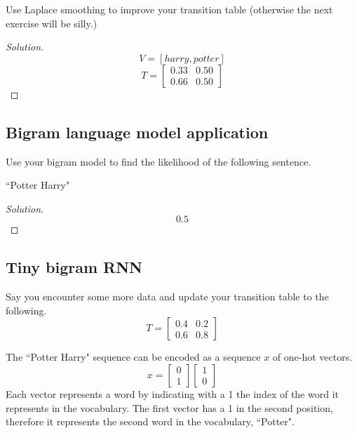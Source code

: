 \documentclass{article}
\begin{document}
Use Laplace smoothing to improve your transition table (otherwise the next exercise will be silly.)

\begin{proof}[Solution]
    $$V = [harry, potter]$$
    $$T = \begin{bmatrix}
        0.33 & 0.50 \\
        0.66 & 0.50
    \end{bmatrix}$$
\end{proof}

\subsection{Bigram language model application}
Use your bigram model to find the likelihood of the following sentence.
\begin{center}
    ``Potter Harry"
\end{center}

\begin{proof}[Solution]
    $$ 0.5 $$
\end{proof}

\subsection{Tiny bigram RNN}
Say you encounter some more data and update your transition table to the following.
$$ T = \begin{bmatrix} 0.4 & 0.2 \\ 0.6 & 0.8 \end{bmatrix} $$

The ``Potter Harry" sequence can be encoded as a sequence $x$ of one-hot vectors.
$$ x = \begin{bmatrix} 0 \\ 1 \end{bmatrix} \begin{bmatrix} 1 \\ 0 \end{bmatrix} $$
Each vector represents a word by indicating with a 1 the index of the word it represents in the vocabulary. The first vector has a 1 in the second position, therefore it represents the second word in the vocabulary, ``Potter".
\end{document}
